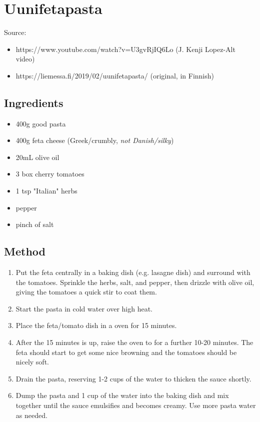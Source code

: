 \clearpage
\section{Uunifetapasta}

  
Source: 
\begin{itemize}
    \item https://www.youtube.com/watch?v=U3gvRjIQ6Lo (J. Kenji Lopez-Alt video)
    \item https://liemessa.fi/2019/02/uunifetapasta/ (original, in Finnish)
\end{itemize}

\subsection{Ingredients}

\begin{itemize}
    \item 400g good pasta
    \item 400g feta cheese (Greek/crumbly, \emph{not Danish/silky})
    \item 20mL olive oil
    \item 3 box cherry tomatoes
    \item 1 tsp "Italian" herbs
    \item pepper
    \item pinch of salt
\end{itemize}

\subsection{Method}

\begin{enumerate}
    \item Put the feta centrally in a baking dish (e.g. lasagne dish) and surround with the tomatoes. Sprinkle the herbs, salt, and pepper, then drizzle with olive oil, giving the tomatoes a quick stir to coat them.
    \item Start the pasta in cold water over high heat.
    \item Place the feta/tomato dish in a  oven for 15 minutes.
    \item After the 15 minutes is up, raise the oven to  for a further 10-20 minutes. The feta should start to get some nice browning and the tomatoes should be nicely soft.
    \item Drain the pasta, reserving 1-2 cups of the water to thicken the sauce shortly.
    \item Dump the pasta and 1 cup of the water into the baking dish and mix together until the sauce emulsifies and becomes creamy. Use more pasta water as needed.
\end{enumerate}
